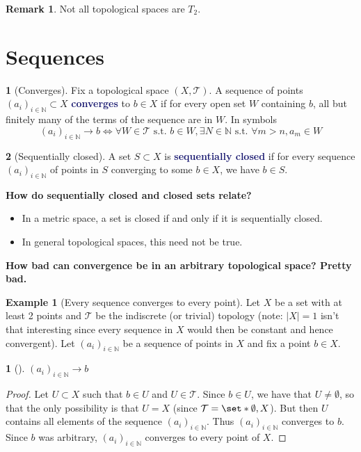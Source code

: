 \documentclass[11pt]{article}
\numberwithin{equation}{section}
\newcommand{\navy}[1]{\textcolor{MidnightBlue}{\bf #1}}
\theoremstyle{plain}
\newtheorem{claim}{\color{ForestGreen}{\textbf{Claim}}}[section]
\theoremstyle{definition}
\newtheorem{definition}{\color{MidnightBlue}{\textbf{Definition}}}[section]
\newtheorem{example}{\color{WildStrawberry}Example}[section]
\newtheorem*{remark}{Remark}
\def\Set{\set*}%
\def\ss{\subset}
\newcommand{\1}{\mathbbm 1}
\newcommand{\NN}{\mathbb N}
\newcommand{\tT}{\mathcal T}
\begin{document}
\begin{remark}
	Not all topological spaces are $T_2$.
\end{remark}

\section{Sequences}

\begin{definition}[Converges]
	Fix a topological space $(X,\tT)$. A sequence of points $(a_i)_{i \in \NN} \ss X$ \navy{converges} to $b \in X$ if for every open set $W$ containing $b$, all but finitely many of the terms of the sequence are in $W$. In symbols
	\begin{equation*}
		(a_i)_{i \in \NN} \to b \iff \forall W\in \tT \text{ s.t. } b \in W, \exists N \in \NN \text{ s.t. } \forall m > n, a_m \in W
	\end{equation*}
	
\end{definition}

\begin{definition}[Sequentially closed]
	A set $S \ss X$ is \navy{sequentially closed} if for every sequence $(a_i)_{i \in \NN}$ of points in $S$ converging to some $b \in X$, we have $b \in S$. 
\end{definition}

\textbf{How do sequentially closed and closed sets relate?}
\begin{itemize}
	\item In a metric space, a set is closed if and only if it is sequentially closed.
	\item In general topological spaces, this need not be true.
\end{itemize}

\textbf{How bad can convergence be in an arbitrary topological space? Pretty bad.}

\begin{example}[Every sequence converges to every point]
	Let $X$ be a set with at least 2 points and $\tT$ be the indiscrete (or trivial) topology (note: $|X| = 1$ isn't that interesting since every sequence in $X$ would then be constant and hence convergent). Let $(a_i)_{i \in \NN}$ be a sequence of points in $X$ and fix a point $b \in X$.

	\begin{claim}[]
		$(a_i)_{i \in \NN} \to b$ 
	\end{claim}
	\begin{proof}
		Let $U \ss X$ such that $b \in U$ and $U \in \tT$. Since $b \in U$, we have that $U \neq \emptyset$, so that the only possibility is that $U = X$ (since $\tT = \Set{\emptyset,X}$). But then $U$ contains all elements of the sequence  $(a_i)_{i \in \NN}$. Thus $(a_i)_{i \in \NN}$ converges to $b$. Since $b$ was arbitrary, $(a_i)_{i \in \NN}$ converges to every point of $X$.
	\end{proof}
	
\end{example}
\end{document}
